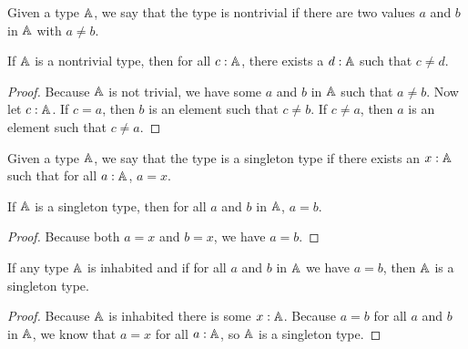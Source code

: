 \documentclass[../../math.tex]{subfiles}
\begin{document}
\begin{class}
    Given a type $\mathbb{A}$, we say that the type is nontrivial if there are two
    values $a$ and $b$ in $\mathbb{A}$ with $a \neq b$.
\end{class}

\begin{theorem} \label{not_trivial2}
    If $\mathbb{A}$ is a nontrivial type, then for all $c : \mathbb{A}$, there exists a $d : \mathbb{A}$
    such that $c \neq d$.
\end{theorem}
\begin{proof}
    Because $\mathbb{A}$ is not trivial, we have some $a$ and $b$ in $\mathbb{A}$ such that $a
    \neq b$.  Now let $c : \mathbb{A}$.  If $c = a$, then $b$ is an element such that $c
    \neq b$.  If $c \neq a$, then $a$ is an element such that $c \neq a$.
\end{proof}

\begin{class}
    Given a type $\mathbb{A}$, we say that the type is a singleton type if there exists
    an $x : \mathbb{A}$ such that for all $a : \mathbb{A}$, $a = x$.
\end{class}

\begin{theorem}
    If $\mathbb{A}$ is a singleton type, then for all $a$ and $b$ in $\mathbb{A}$, $a = b$.
\end{theorem}
\begin{proof}
    Because both $a = x$ and $b = x$, we have $a = b$.
\end{proof}

\begin{theorem}
    If any type $\mathbb{A}$ is inhabited and if for all $a$ and $b$ in $\mathbb{A}$ we have $a
    = b$, then $\mathbb{A}$ is a singleton type.
\end{theorem}
\begin{proof}
    Because $\mathbb{A}$ is inhabited there is some $x : \mathbb{A}$.  Because $a = b$ for all
    $a$ and $b$ in $\mathbb{A}$, we know that $a = x$ for all $a : \mathbb{A}$, so $\mathbb{A}$ is a
    singleton type.
\end{proof}
\end{document}

